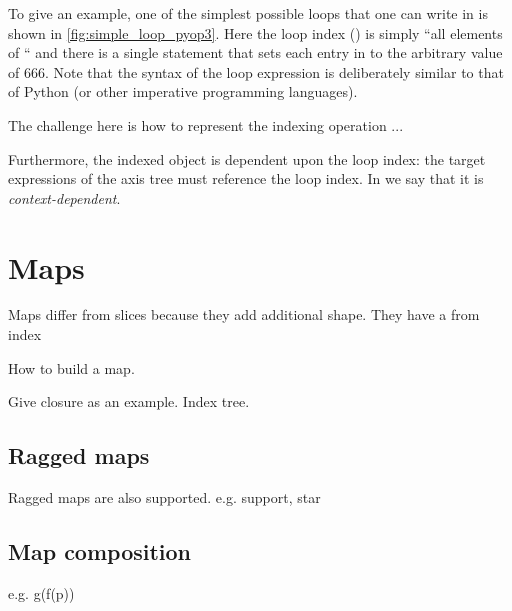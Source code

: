 \documentclass[thesis]{subfiles}
\begin{document}
To give an example, one of the simplest possible loops that one can write in  is shown in \cref{fig:simple_loop_pyop3}.
Here the loop index () is simply ``all elements of `` and there is a single statement that sets each entry in  to the arbitrary value of 666.
Note that the syntax of the loop expression is deliberately similar to that of Python (or other imperative programming languages).

The challenge here is how to represent the indexing operation ...


Furthermore, the indexed object is dependent upon the loop index: the target expressions of the axis tree must reference the loop index.
In  we say that it is \textit{context-dependent}.



\section{Maps}

Maps differ from slices because they add additional shape. They have a from index

How to build a map.

Give closure as an example. Index tree.

\subsection{Ragged maps}

Ragged maps are also supported. e.g. support, star

\subsection{Map composition}

e.g. g(f(p))
\end{document}

